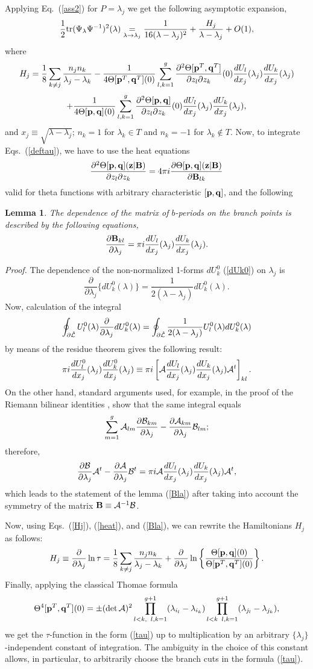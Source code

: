 \documentclass[11pt]{article}
\def\underset#1#2{\mathrel{\mathop{#2}\limits_{#1}}}
\newtheorem{lemma}{Lemma}[section]
\def\be{\begin{equation}}
\def\ee{\end{equation}}
\def\ben{\begin{displaymath}}
\def\een{\end{displaymath}}
\def\l{\lambda}
\def\Th{\Theta}
\def\B{{\bf B}}
\def\z{{\bf z}}
\def\la{\label}
\def\f{\frac}
\def\L{{\cal L}}
\def\pb{{\bf p}}
\def\qb{{\bf q}}
\def\tr{{\rm tr}}
\def\1{T}
\def\log{\ln}
\begin{document}
Applying Eq.~(\ref{ass2}) for $P=\l_j$ we get the following asymptotic expansion, 
\be
\f{1}{2}\tr  (\Psi_\l\Psi^{-1})^2(\l)\underset{\l\to\l_j}=\f{1}{16(\l-\l_j)^2}+ \f{H_j}{\l-\l_j}+ O(1),
\la{ass3}\ee
where
\ben
H_j= \f{1}{8}\sum_{k\neq j}\f{n_j n_k}{\l_j-\l_k}-
\f{1}{4\Th[\pb^\1,\qb^\1](0)}\sum_{l,k=1}^g\f{\partial^2\Th[\pb^\1,\qb^\1]}
{\partial z_l\partial z_k} (0)\f{dU_l}{dx_j}(\l_j)\f{dU_k}{dx_j}(\l_j)
\een
\be
+\f{1}{4\Th[\pb,\qb](0)}\sum_{l,k=1}^g\f{\partial^2\Th[\pb,\qb]}
{\partial z_l\partial z_k} (0)\f{dU_l}{dx_j}(\l_j)\f{dU_k}{dx_j}(\l_j),
\la{Hj}\ee
and $x_j\equiv \sqrt{\l-\l_j}$; $n_k=1$ for $\l_k\in \1$ and  $n_k=-1$
for  $\l_k\not\in \1$.
Now, to integrate Eqs.~(\ref{deftau}), we have to use the heat equations
\be
\f{\partial^2\Th[\pb,\qb](\z|\B)}
{\partial z_l\partial z_k}= 4\pi i\f{\partial\Th[\pb,\qb](\z|\B)}
{\partial \B_{lk}}
\la{heat} 
\ee
valid for theta functions with arbitrary characteristic $[\pb,\qb]$, and the following
\begin{lemma}
The dependence of the matrix of $b$-periods on the branch points is 
described by the following equations,
\be
\f{\partial \B_{kl}}{\partial \l_j}=
\pi i \f{dU_l}{dx_j}(\l_j)\f{dU_k}{dx_j}(\l_j).
\la{Bla}\ee
\end{lemma}
{\it Proof.} 
The dependence of the non-normalized 1-forms $dU_k^0$ (\ref{dUk0}) on $\l_j$ is
\ben
\f{\partial}{\partial \l_j}\{dU_k^0(\l)\} =\f{1}{2(\l-\l_j)}dU_k^0(\l). 
\een
Now, calculation of the integral 
\ben
\oint_{\partial\hat{\L}} U_l^0(\l)\f{\partial}{\partial \l_j}dU_k^0(\l)=
\oint_{\partial\hat{\L}}\f{1}{2(\l-\l_j)} U_l^0(\l)dU_k^0(\l)
\een
by means of the residue theorem gives the following result:
\ben
\pi i \f{dU^0_l}{dx_j}(\l_j)\f{dU^0_k}{dx_j}(\l_j) \equiv
\pi i \left[{\cal A} \f{dU_l}{dx_j}(\l_j)\f{dU_k}{dx_j}(\l_j){\cal A}^t\right]_{kl}.
\een
On the other hand, standard arguments used, for example, in the proof of the Riemann bilinear identities \cite{GurCour}, show that the same integral equals 
\ben
\sum_{m=1}^g {\cal A}_{lm}\f{\partial {\cal B}_{km}}{\partial \l_j}-
\f{\partial {\cal A}_{km}}{\partial \l_j} {\cal B}_{lm}; 
\een
therefore,
\ben
\f{\partial {\cal B}}{\partial \l_j}{\cal A}^t- \f{\partial {\cal A}}{\partial \l_j} {\cal B}^t=
\pi i {\cal A} \f{dU_l}{dx_j}(\l_j)\f{dU_k}{dx_j}(\l_j){\cal A}^t,
\een
which leads to the statement of the lemma  (\ref{Bla}) after taking into account the symmetry of the matrix 
$\B\equiv {\cal A}^{-1} {\cal B}$.
\vskip0.5cm

Now, using Eqs.~(\ref{Hj}), (\ref{heat}), and (\ref{Bla}), we can rewrite the Hamiltonians $H_j$ as follows:
\ben
H_j\equiv\f{\partial }{\partial \l_j}\log\tau= \f{1}{8}\sum_{k\neq j}\f{n_j n_k}{\l_j-\l_k}+\f{\partial }{\partial \l_j}\log
\left\{\f{\Th[\pb,\qb](0)}{\Th[\pb^\1,\qb^\1](0)}\right\}.
\een
Finally, applying the classical Thomae formula \cite{Thomae,Mum}
\ben
\Th^4[\pb^\1,\qb^\1](0)=\pm(\det{\cal A})^2 \prod_{l<k,\;\;l,k=1}^{g+1} (\l_{i_l}-\l_{i_k})
 \prod_{l<k\;\;l,k=1}^{g+1}(\l_{j_l}-\l_{j_k}),
\een
we get the $\tau$-function in the form  (\ref{tau}) up to multiplication by an  arbitrary $\{\l_j\}$-independent constant of integration. The ambiguity in the choice of this constant allows, in particular, to arbitrarily choose the branch cuts in the formula (\ref{tau}).
\end{document}
